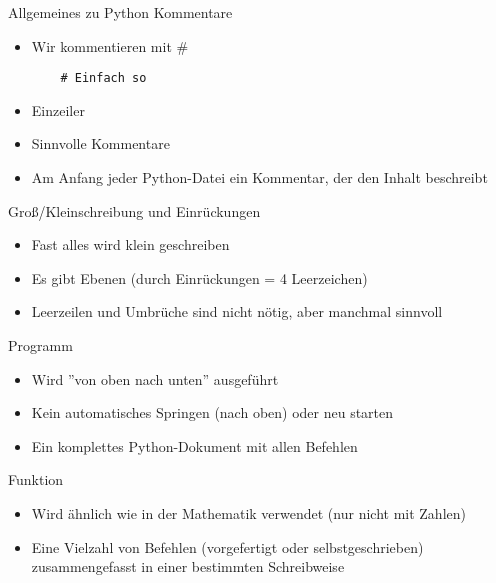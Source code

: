 \begin{frame}[fragile]{Allgemeines zu Python}
Kommentare
\begin{itemize}
	\item Wir kommentieren mit \#
	
	\begin{lstlisting}
	# Einfach so
	\end{lstlisting}

	\item Einzeiler
	\item Sinnvolle Kommentare
	\item Am Anfang jeder Python-Datei ein Kommentar, der den Inhalt beschreibt
\end{itemize}
\end{frame}

\begin{frame}[fragile]{Groß/Kleinschreibung und Einrückungen }

\begin{itemize}
	\item Fast alles wird klein geschreiben
	\item Es gibt Ebenen (durch Einrückungen = 4 Leerzeichen)
	\item Leerzeilen und Umbrüche sind nicht nötig, aber manchmal sinnvoll 
	
\end{itemize}
\end{frame}

\begin{frame}{Programm}
\begin{itemize}
	\item Wird ''von oben nach unten'' ausgeführt
	\item Kein automatisches Springen (nach oben) oder neu starten
	\item Ein komplettes Python-Dokument mit allen Befehlen
\end{itemize}
\end{frame}

\begin{frame}{Funktion}
	\begin{itemize}
	\item Wird ähnlich wie in der Mathematik verwendet (nur nicht mit Zahlen)
	\item Eine Vielzahl von Befehlen (vorgefertigt oder selbstgeschrieben) zusammengefasst in einer bestimmten Schreibweise	
	\end{itemize}
\end{frame}

